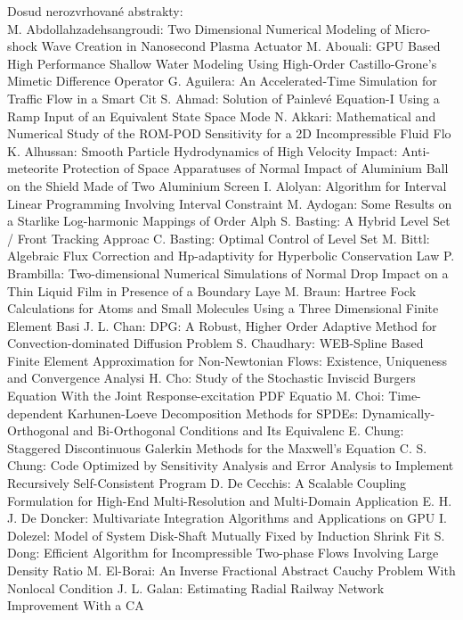 \documentclass[10pt, A4]{article}%
\begin{document}
\newpage
Dosud nerozvrhované abstrakty:\\
{M. Abdollahzadehsangroudi}: {Two Dimensional Numerical Modeling of Micro-shock Wave Creation in Nanosecond Plasma Actuator}
{M. Abouali}: {GPU Based High Performance Shallow Water Modeling Using High-Order Castillo-Grone's Mimetic Difference Operator}
{G. Aguilera}: {An Accelerated-Time Simulation for Traffic Flow in a Smart Cit}
{S. Ahmad}: {Solution of Painlevé Equation-I Using a Ramp Input of an Equivalent State Space Mode}
{N. Akkari}: {Mathematical and Numerical Study of the ROM-POD Sensitivity for a 2D Incompressible Fluid Flo}
{K. Alhussan}: {Smooth Particle Hydrodynamics of High Velocity Impact: Anti-meteorite Protection of Space Apparatuses of Normal Impact of Aluminium Ball on the Shield Made of Two Aluminium Screen}
{I. Alolyan}: {Algorithm for Interval Linear  Programming Involving Interval Constraint}
{M. Aydogan}: {Some  Results on a Starlike  Log-harmonic Mappings of Order Alph}
{S. Basting}: {A Hybrid Level Set / Front Tracking Approac}
{C. Basting}: {Optimal Control of Level Set}
{M. Bittl}: {Algebraic Flux Correction and Hp-adaptivity for Hyperbolic Conservation Law}
{P. Brambilla}: {Two-dimensional Numerical Simulations of Normal Drop Impact on a Thin Liquid Film in Presence of a Boundary Laye}
{M. Braun}: {Hartree Fock Calculations for Atoms and Small Molecules Using  a Three Dimensional  Finite Element Basi}
{J. L. Chan}: {DPG: A Robust, Higher Order Adaptive Method for Convection-dominated Diffusion Problem}
{S. Chaudhary}: {WEB-Spline Based Finite Element Approximation for Non-Newtonian Flows: Existence, Uniqueness and Convergence Analysi}
{H. Cho}: {Study of the Stochastic Inviscid Burgers Equation With the Joint Response-excitation PDF Equatio}
{M. Choi}: {Time-dependent Karhunen-Loeve Decomposition Methods for SPDEs: Dynamically-Orthogonal and Bi-Orthogonal Conditions and Its Equivalenc}
{E. Chung}: {Staggered Discontinuous Galerkin Methods for the Maxwell's Equation}
{C. S. Chung}: {Code Optimized by Sensitivity Analysis and Error Analysis to Implement Recursively Self-Consistent Program}
{D. De Cecchis}: {A Scalable Coupling Formulation for High-End Multi-Resolution and Multi-Domain Application}
{E. H. J. De Doncker}: {Multivariate Integration Algorithms and Applications on GPU}
{I. Dolezel}: {Model of System Disk-Shaft Mutually Fixed by Induction Shrink Fit}
{S. Dong}: {Efficient Algorithm for Incompressible Two-phase Flows Involving Large Density Ratio}
{M. El-Borai}: {An Inverse Fractional Abstract Cauchy Problem With Nonlocal Condition}
{J. L. Galan}: {Estimating Radial Railway Network Improvement With a CA}
\end{document}
